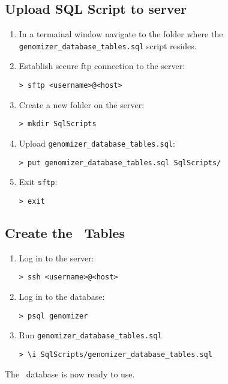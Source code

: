     \subsection{Upload SQL Script to server}

    \begin{enumerate}

      \item In a termainal window navigate to the folder where the \verb+genomizer_database_tables.sql+ script resides.

      \item Establish secure ftp connection to the server:
      \begin{verbatim}
> sftp <username>@<host>
      \end{verbatim}

      \item Create a new folder on the server:
      \begin{verbatim}
> mkdir SqlScripts
      \end{verbatim}

      \item Upload \verb+genomizer_database_tables.sql+:
      \begin{verbatim}
> put genomizer_database_tables.sql SqlScripts/
      \end{verbatim}

      \item Exit \texttt{sftp}:
      \begin{verbatim}
> exit
      \end{verbatim}

    \end{enumerate}

    \subsection{Create the \appName\ Tables}

    \begin{enumerate}

      \item Log in to the server:
      \begin{verbatim}
> ssh <username>@<host>
      \end{verbatim}

      \item Log in to the database:
      \begin{verbatim}
> psql genomizer
      \end{verbatim}

      \item Run \verb+genomizer_database_tables.sql+
      \begin{verbatim}
> \i SqlScripts/genomizer_database_tables.sql
      \end{verbatim}


    \end{enumerate}

The \appName\ database is now ready to use.
